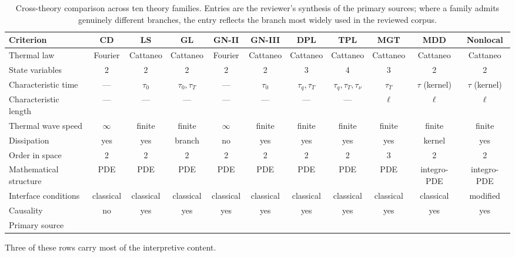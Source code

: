 \begin{table}[h]
\centering
\footnotesize
\caption{Cross-theory comparison across ten theory families. Entries are the reviewer's synthesis of the primary sources; where a family admits genuinely different branches, the entry reflects the branch most widely used in the reviewed corpus.}
\label{tab:twelve_criteria}
\begin{tabularx}{\textwidth}{@{}lcccccccccc@{}}
\toprule
\textbf{Criterion} & \textbf{CD} & \textbf{LS} & \textbf{GL} & \textbf{GN-II} & \textbf{GN-III} & \textbf{DPL} & \textbf{TPL} & \textbf{MGT} & \textbf{MDD} & \textbf{Nonlocal} \\
\midrule
Thermal law & Fourier & Cattaneo & Cattaneo & Fourier & Cattaneo & Cattaneo & Cattaneo & Cattaneo & Cattaneo & Cattaneo \\
State variables & 2 & 2 & 2 & 2 & 2 & 3 & 4 & 3 & 2 & 2 \\
Characteristic time & --- & $\tau_0$ & $\tau_0,\tau_T$ & --- & $\tau_0$ & $\tau_q,\tau_T$ & $\tau_q,\tau_T,\tau_\nu$ & $\tau_T$ & $\tau$ (kernel) & $\tau$ (kernel) \\
Characteristic length & --- & --- & --- & --- & --- & --- & --- & $\ell$ & $\ell$ & $\ell$ \\
Thermal wave speed & $\infty$ & finite & finite & $\infty$ & finite & finite & finite & finite & finite & finite \\
Dissipation & yes & yes & branch & no & yes & yes & yes & yes & kernel & yes \\
Order in space & 2 & 2 & 2 & 2 & 2 & 2 & 2 & 3 & 2 & 2 \\
Mathematical structure & PDE & PDE & PDE & PDE & PDE & PDE & PDE & PDE & integro-PDE & integro-PDE \\
Interface conditions & classical & classical & classical & classical & classical & classical & classical & classical & classical & modified \\
Causality & no & yes & yes & yes & yes & yes & yes & yes & yes & yes \\
Primary source & \cite{Biot1956} & \cite{Lord1967} & \cite{Green1972} & \cite{Green1991} & \cite{Green1993} & \cite{Tzou1995} & \cite{Tzou1997} & \cite{Quintanilla2019} & \cite{Wang2011} & \cite{Eringen1972} \\
\bottomrule
\end{tabularx}
\end{table}

Three of these rows carry most of the interpretive content.


